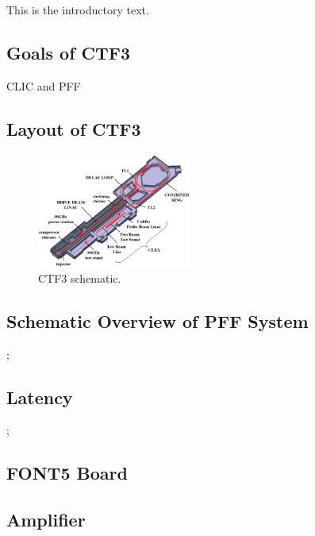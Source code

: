 
This is the introductory text.


\subsection{Goals of CTF3}
\label{ss:ctfGoals}

CLIC and PFF

\subsection{Layout of CTF3}
\label{ss:ctfLayout}

\begin{figure}
  \centering
  \includegraphics[width=0.45\textwidth]{Figures/ctfLayout}
  \caption{CTF3 schematic.}
  \label{f:ctfLayout}
\end{figure}


\subsection{Schematic Overview of PFF System}
\label{ss:ctfPFFLayout};

\subsection{Latency}
\label{ss:availLatency};


\subsection{FONT5 Board}
\label{ss:font5}

\subsection{Amplifier}
\label{ss:amplifier}

